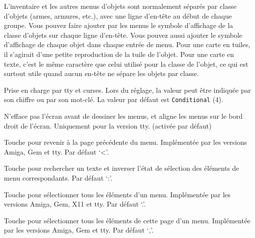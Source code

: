 \documentclass[titlepage]{article}
\begin{document}
\begin{description}[font=\mdseries\itshape]
L'inventaire et les autres menus d'objets sont normalement séparés par classe d'objets
(armes, armures, etc.), avec une ligne d'en-tête au début
de chaque groupe.
Vous pouvez faire ajouter par les menus le symbole d'affichage de la classe d'objets sur
chaque ligne d'en-tête.
Vous pouvez aussi ajouter le symbole d'affichage de chaque objet dans chaque entrée
de menu.
Pour une carte en tuiles, il s'agirait d'une petite reproduction de la tuile de l'objet.
Pour une carte en texte, c'est le même caractère que celui utilisé pour la
classe de l'objet, ce qui est surtout utile quand aucun en-tête ne sépare
les objets par classe.

Prise en charge par tty et curses.
Lors du réglage, la valeur peut être indiquée par son chiffre ou par son mot-clé.
La valeur par défaut est \texttt{Conditional} (4).
\item[menu\textunderscore overlay]
N'efface pas l'écran avant de dessiner les menus, et aligne
les menus sur le bord droit de l'écran. Uniquement pour la version tty.
(activée par défaut)
\item[menu\textunderscore previous\textunderscore page]
Touche pour revenir à la page précédente du menu.
Implémentée par les versions Amiga, Gem et tty.
Par défaut `<'.
\item[menu\textunderscore search]
Touche pour rechercher un texte et inverser l'état de sélection des éléments de menu correspondants.
Par défaut `:'.
\item[menu\textunderscore select\textunderscore all]
Touche pour sélectionner tous les éléments d'un menu.
Implémentée par les versions Amiga, Gem, X11 et tty.
Par défaut `.'.
\item[menu\textunderscore select\textunderscore page]
Touche pour sélectionner tous les éléments de cette page d'un menu.
Implémentée par les versions Amiga, Gem et tty.
Par défaut `,'.


\end{description}
\end{document}
